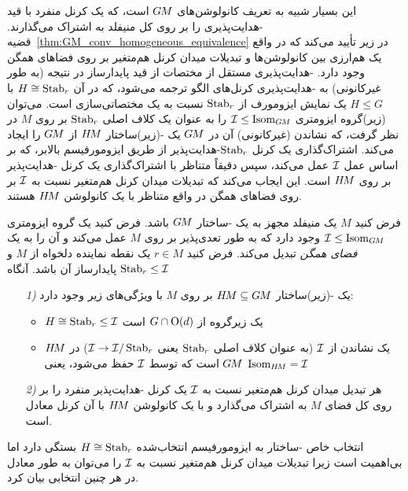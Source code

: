 این بسیار شبیه به تعریف کانولوشن‌های $G\mkern-1.4muM$ است، که یک کرنل منفرد با قید -هدایت‌پذیری را بر روی کل منیفلد به اشتراک می‌گذارند.
قضیه~\ref{thm:GM_conv_homogeneous_equivalence} در زیر تأیید می‌کند که در واقع یک هم‌ارزی بین کانولوشن‌ها و تبدیلات میدان کرنل هم‌متغیر بر روی فضاهای همگن وجود دارد.
-هدایت‌پذیری مستقل از مختصات از قید پایدارساز در نتیجه (به طور غیرکانونی) به -هدایت‌پذیری کرنل‌های الگو ترجمه می‌شود، که در آن $H \cong \operatorname{Stab}_{r}$ با $H\leq G$ یک نمایش ایزومورف از $\operatorname{Stab}_{r}$ نسبت به یک مختصاتی‌سازی است.
می‌توان (زیر)گروه ایزومتری $\mathcal{I} \leq \operatorname{Isom}_{G\mkern-1.4muM}$ را به عنوان یک کلاف اصلی $\operatorname{Stab}_{r}$ بر روی $M$ در نظر گرفت، که نشاندن (غیرکانونی) آن در $G\mkern-1.4muM$ یک -(زیر)ساختار $H\mkern-2.5muM$ از $G\mkern-1.4muM$ را ایجاد می‌کند.
اشتراک‌گذاری یک کرنل $\operatorname{Stab}_{r}$-هدایت‌پذیر از طریق ایزومورفیسم بالابر، که بر اساس عمل $\mathcal{I}$ عمل می‌کند،
سپس دقیقاً متناظر با اشتراک‌گذاری یک کرنل -هدایت‌پذیر بر روی $H\mkern-2.5muM$ است.
این ایجاب می‌کند که تبدیلات میدان کرنل هم‌متغیر نسبت به $\mathcal{I}$ بر روی فضاهای همگن در واقع متناظر با یک کانولوشن $H\mkern-2.5muM$ هستند.
\begin{thm}
\label{thm:GM_conv_homogeneous_equivalence}
    فرض کنید $M$ یک منیفلد مجهز به یک -ساختار $G\mkern-1.4muM$ باشد.
    فرض کنید یک گروه ایزومتری $\mathcal{I} \leq \operatorname{Isom}_{G\mkern-1.4muM}$ وجود دارد که به طور تعدی‌پذیر بر روی $M$ عمل می‌کند و آن را به یک \emph{فضای همگن} تبدیل می‌کند.
    فرض کنید $r\in M$ یک نقطه نماینده دلخواه از $M$ و $\operatorname{Stab}_{r} \leq \mathcal{I}$ پایدارساز آن باشد.
    آنگاه
    \begin{itemize}
        \item[\textit{1)}] یک -(زیر)ساختار $H\mkern-2.5muM \subseteq G\mkern-1.4muM$ بر روی $M$ با ویژگی‌های زیر وجود دارد:
            \begin{itemize}\setlength\itemsep{1ex}
                \item $H \cong \operatorname{Stab}_{r} \leq \mathcal{I}$ یک زیرگروه از $G \cap \operatorname{O}(d)$ است
                \item $H\mkern-2.5muM$ یک نشاندن از $\mathcal{I}$ (به عنوان کلاف اصلی $\operatorname{Stab}_{r}$ یعنی $\mathcal{I} \to \mathcal{I}/\operatorname{Stab}_{r}$) در $G\mkern-1.4muM$ است که توسط $\mathcal{I}$ حفظ می‌شود، یعنی $\operatorname{Isom}_{H\mkern-2.5muM} = \mathcal{I}$
            \end{itemize}
        \item[\textit{2)}] هر تبدیل میدان کرنل هم‌متغیر نسبت به $\mathcal{I}$ یک کرنل -هدایت‌پذیر منفرد را بر روی کل فضای $M$ به اشتراک می‌گذارد و با یک کانولوشن $H\mkern-2.5muM$ با آن کرنل معادل است.
    \end{itemize}
    انتخاب خاص -ساختار به ایزومورفیسم انتخاب‌شده $H \cong \operatorname{Stab}_{r}$ بستگی دارد اما بی‌اهمیت است زیرا تبدیلات میدان کرنل هم‌متغیر نسبت به $\mathcal{I}$ را می‌توان به طور معادل در هر چنین انتخابی بیان کرد.
\end{thm}
